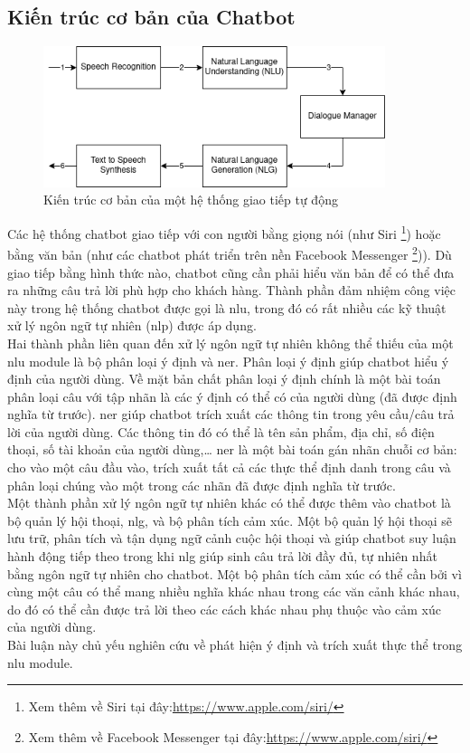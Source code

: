 \subsection{Kiến trúc cơ bản của Chatbot}
\begin{figure}[htp]
    \centering
    \includegraphics[width=10cm]{images/Kiến trúc cơ bản của hệ thống giao tiếp tự động.png}
    \caption{Kiến trúc cơ bản của một hệ thống giao tiếp tự động}
    \label{fig:Kiến trúc cơ bản của hệ thống giao tiếp tự động}
\end{figure}

Các hệ thống chatbot giao tiếp với con người bằng giọng nói (như Siri \footnote{Xem thêm về Siri tại đây:\url{https://www.apple.com/siri/}}) hoặc bằng văn bản (như các chatbot phát triển trên nền Facebook Messenger \footnote{Xem thêm về Facebook Messenger tại đây:\url{https://www.apple.com/siri/}})). Dù giao tiếp bằng hình thức nào, chatbot cũng cần phải hiểu văn bản để có thể đưa ra những câu trả lời phù hợp cho khách hàng. Thành phần đảm nhiệm công việc này trong hệ thống chatbot được gọi là \ac{nlu}, trong đó có rất nhiều các kỹ thuật xử lý ngôn ngữ tự nhiên (\ac{nlp}) được áp dụng.
\\
Hai thành phần liên quan đến xử lý ngôn ngữ tự nhiên không thể thiếu của một \ac{nlu} module là bộ phân loại ý định và \ac{ner}. Phân loại ý định giúp chatbot hiểu ý định của người dùng. Về mặt bản chất phân loại ý định chính là một bài toán phân loại câu với tập nhãn là các ý định có thể có của người dùng (đã được định nghĩa từ trước). \ac{ner} giúp chatbot trích xuất các thông tin trong yêu cầu/câu trả lời của người dùng. Các thông tin đó có thể là tên sản phẩm, địa chỉ, số điện thoại, số tài khoản của người dùng,… \ac{ner} là một bài toán gán nhãn chuỗi cơ bản: cho vào một câu đầu vào, trích xuất tất cả các thực thể định danh trong câu và phân loại chúng vào một trong các nhãn đã được định nghĩa từ trước.
\\
Một thành phần xử lý ngôn ngữ tự nhiên khác có thể được thêm vào chatbot là bộ quản lý hội thoại, \ac{nlg}, và bộ phân tích cảm xúc. Một bộ quản lý hội thoại sẽ lưu trữ, phân tích và tận dụng ngữ cảnh cuộc hội thoại và giúp chatbot suy luận hành động tiếp theo trong khi \ac{nlg} giúp sinh câu trả lời đầy đủ, tự nhiên nhất bằng ngôn ngữ tự nhiên cho chatbot. Một bộ phân tích cảm xúc có thể cần bởi vì cùng một câu có thể mang nhiều nghĩa khác nhau trong các văn cảnh khác nhau, do đó có thể cần được trả lời theo các cách khác nhau phụ thuộc vào cảm xúc của người dùng.
\\
Bài luận này chủ yếu nghiên cứu về phát hiện ý định và trích xuất thực thể trong \ac{nlu} module.

